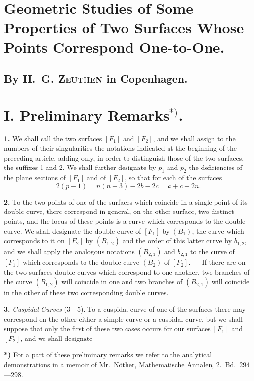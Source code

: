 \documentclass{article}
\begin{document}
\section*{Geometric Studies of Some Properties of Two Surfaces Whose Points Correspond One-to-One.}

\subsection*{By H.~G. \textsc{Zeuthen} in Copenhagen.}

\section*{I. Preliminary Remarks${}^{*)}$.}

\textbf{1.} We shall call the two surfaces $[F_1]$ and $[F_2]$, and we shall assign to the numbers of their singularities the notations indicated at the beginning of the preceding article, adding only, in order to distinguish those of the two surfaces, the suffixes 1 and 2. We shall further designate by $p_1$ and $p_2$ the deficiencies of the plane sections of $[F_1]$ and of $[F_2]$, so that for each of the surfaces
\[
2(p - 1) = n(n - 3) - 2b - 2c = a + c - 2n. \tag{1}
\]

\textbf{2.} To the two points of one of the surfaces which coincide in a single point of its double curve, there correspond in general, on the other surface, two distinct points, and the locus of these points is a curve which corresponds to the double curve. We shall designate the double curve of $[F_1]$ by $(B_1)$, the curve which corresponds to it on $[F_2]$ by $(B_{1, 2})$ and the order of this latter curve by $b_{1, 2}$, and we shall apply the analogous notations $(B_{2, 1})$ and $b_{2, 1}$ to the curve of $[F_1]$ which corresponds to the double curve $(B_2)$ of $[F_2]$. --- If there are on the two surfaces double curves which correspond to one another, two branches of the curve $(B_{1, 2})$ will coincide in one and two branches of $(B_{2, 1})$ will coincide in the other of these two corresponding double curves.

\textbf{3.} \emph{Cuspidal Curves} (3---5). To a cuspidal curve of one of the surfaces there may correspond on the other either a simple curve or a cuspidal curve, but we shall suppose that only the first of these two cases occurs for our surfaces $[F_1]$ and $[F_2]$, and we shall designate

\textbf{*)} For a part of these preliminary remarks we refer to the analytical demonstrations in a memoir of Mr.~Nöther, Mathematische Annalen, 2.~Bd.\ 294---298.
\end{document}
